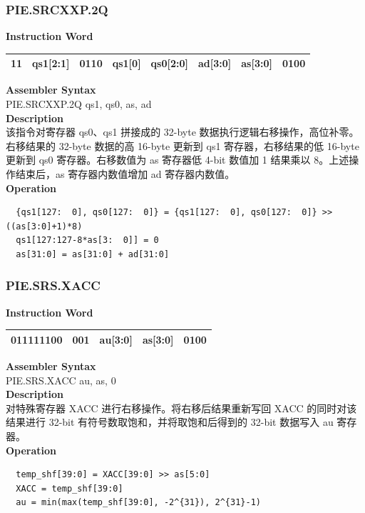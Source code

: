 \newpage
\subsubsection{PIE.SRCXXP.2Q}\label{instruction:PIESRCXXP2Q}
\setlength\tabcolsep{6pt}
\textbf{Instruction Word} \\
\begin{tabular}{|c|c|c|c|c|c|c|c|}
	\hline
	11 & qs1[2:1] & 0110 & qs1[0] & qs0[2:0] & ad[3:0] & as[3:0] & 0100 \\
	\hline
\end{tabular}

\textbf{Assembler Syntax} \\
PIE.SRCXXP.2Q qs1, qs0, as, ad \\
\textbf{Description} \\
该指令对寄存器 qs0、qs1 拼接成的 32-byte 数据执行逻辑右移操作，高位补零。右移结果的 32-byte 数据的高 16-byte 更新到 qs1 寄存器，右移结果的低 16-byte 更新到 qs0 寄存器。右移数值为 as 寄存器低 4-bit 数值加 1 结果乘以 8。上述操作结束后，as 寄存器内数值增加 ad 寄存器内数值。\\
\textbf{Operation}
\begin{lstlisting}
  {qs1[127:  0], qs0[127:  0]} = {qs1[127:  0], qs0[127:  0]} >> ((as[3:0]+1)*8)
  qs1[127:127-8*as[3:  0]] = 0
  as[31:0] = as[31:0] + ad[31:0]
\end{lstlisting}

\newpage
\subsubsection{PIE.SRS.XACC}\label{instruction:PIESRSXACC}
\setlength\tabcolsep{6pt}
\textbf{Instruction Word} \\
\begin{tabular}{|c|c|c|c|c|}
	\hline
	011111100 & 001 & au[3:0] & as[3:0] & 0100 \\
	\hline
\end{tabular}

\textbf{Assembler Syntax} \\
PIE.SRS.XACC au, as, 0 \\
\textbf{Description} \\
对特殊寄存器 XACC 进行右移操作。将右移后结果重新写回 XACC 的同时对该结果进行 32-bit 有符号数取饱和，并将取饱和后得到的 32-bit 数据写入 au 寄存器。\\
\textbf{Operation}
\begin{lstlisting}
  temp_shf[39:0] = XACC[39:0] >> as[5:0]
  XACC = temp_shf[39:0]
  au = min(max(temp_shf[39:0], -2^{31}), 2^{31}-1)
\end{lstlisting}

